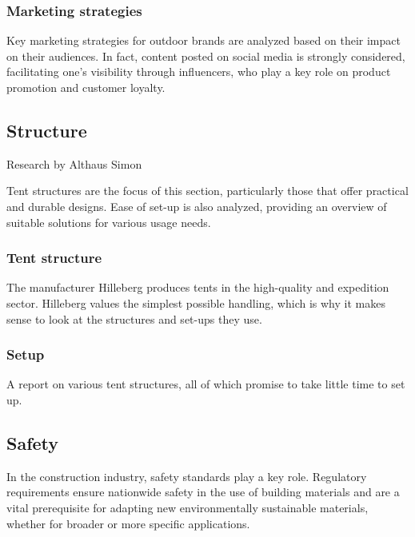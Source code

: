 \documentclass{article}
\begin{document}

\subsubsection{Marketing strategies}
Key marketing strategies for outdoor brands are analyzed based on their impact on their
audiences. In fact, content posted on social media is strongly considered, facilitating
one's visibility through influencers, who play a key role on product promotion and
customer loyalty.\\


\subsection{Structure}
{\small Research by Althaus Simon}

Tent structures are the focus of this section, particularly those that offer practical and
durable designs. Ease of set-up is also analyzed, providing an overview of suitable
solutions for various usage needs.

\subsubsection{Tent structure}
The manufacturer Hilleberg produces tents in the high-quality and expedition sector.
Hilleberg values the simplest possible handling, which is why it makes sense to look at
the structures and set-ups they use.\\


\subsubsection{Setup}
A report on various tent structures, all of which promise to take
little time to set up.\\


\subsection{Safety}
In the construction industry, safety standards play a key role.
Regulatory requirements ensure nationwide safety in the use of
building materials and are a vital prerequisite for adapting new
environmentally sustainable materials, whether for broader or more
specific applications.
\end{document}
